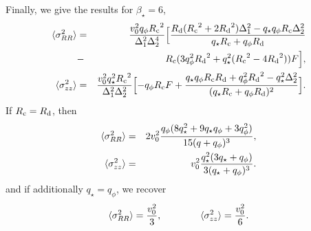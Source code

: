 \documentclass[prd,twocolumn,showpacs,preprintnumbers,superscriptaddress,nofootinbib,amsmath,amssymb,nobalancelastpage]{revtex4}
\def\Rd{{R_{\rm d}}}
\def\Rc{{R_{\rm c}}}
\begin{document}
Finally, we give the results for $\beta_\star =6$,
%
\begin{eqnarray}
\langle\sigma^2_{RR}\rangle &=&  {v_0^2 q_\phi\Rc^2 \over
 \Delta_1^2\Delta_2^4} \Bigl[
{ \Rd(\Rc^2+2\Rd^2)\Delta_1^2  -q_\star q_\phi\Rc\Delta_2^2 \over
    q_\star\Rc + q_\phi\Rd}\nonumber\\
&-&\Rc(3q_\phi^2\Rd^2+q_\star^2(\Rc^2-4\Rd^2))F
\Bigr], \\
\langle\sigma^2_{zz}\rangle &=&
{v_0^2 q_\star^2 \Rc^2 \over \Delta_1^2\Delta_2^2}
\Bigl[ -q_\phi \Rc F
+ {q_\star q_\phi\Rc\Rd + q_\phi^2\Rd^2 - q_\star^2\Delta_2^2 \over
(q_\star\Rc + q_\phi \Rd)^2}\Bigr].\nonumber
\end{eqnarray}
%
If $\Rc = \Rd$, then
%
\begin{eqnarray}
\langle\sigma^2_{RR}\rangle &=& 2v_0^2 {q_\phi(8q_\star^2 +
  9q_\star q_\phi + 3q_\phi^2)\over 15 (q+ q_\phi)^3},
\nonumber \\
\langle\sigma^2_{zz}\rangle &=& v_0^2 {q_\star^2(3q_\star+q_\phi)\over
  3(q_\star+q_\phi)^3}.
\end{eqnarray}
%
and if additionally $q_\star = q_\phi$, we recover
%
\begin{equation}
\langle\sigma^2_{RR}\rangle = {v_0^2 \over 3},\qquad\qquad
\langle\sigma^2_{zz}\rangle = {v_0^2\over 6}.
\end{equation}
\end{document}
